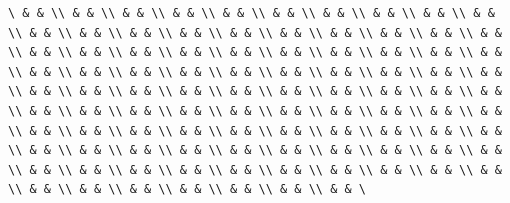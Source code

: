 \documentclass[
  ukrainian,
]{article}
\begin{document}
\begin{verbatim}
\ & & \\ & & \\ & & \\ & & \\ & & \\ & & \\ & & \\ & & \\ & & \\ & & \\ & & \\ & & \\ & & \\ & & \\ & & \\ & & \\ & & \\ & & \\ & & \\ & & \\ & & \\ & & \\ & & \\ & & \\ & & \\ & & \\ & & \\ & & \\ & & \\ & & \\ & & \\ & & \\ & & \\ & & \\ & & \\ & & \\ & & \\ & & \\ & & \\ & & \\ & & \\ & & \\ & & \\ & & \\ & & \\ & & \\ & & \\ & & \\ & & \\ & & \\ & & \\ & & \\ & & \\ & & \\ & & \\ & & \\ & & \\ & & \\ & & \\ & & \\ & & \\ & & \\ & & \\ & & \\ & & \\ & & \\ & & \\ & & \\ & & \\ & & \\ & & \\ & & \\ & & \\ & & \\ & & \\ & & \\ & & \\ & & \\ & & \\ & & \\ & & \\ & & \\ & & \\ & & \\ & & \\ & & \\ & & \\ & & \\ & & \\ & & \\ & & \\ & & \\ & & \\ & & \\ & & \\ & & \\ & & \
\end{verbatim}
\end{document}
